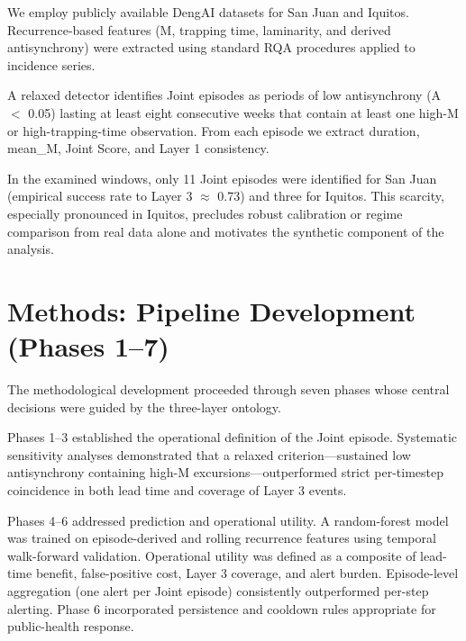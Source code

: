 \documentclass[11pt,a4paper]{article}
\begin{document}
We employ publicly available DengAI datasets for San Juan and Iquitos. Recurrence-based features (M, trapping time, laminarity, and derived antisynchrony) were extracted using standard RQA procedures applied to incidence series.

A relaxed detector identifies Joint episodes as periods of low antisynchrony (A $<$ 0.05) lasting at least eight consecutive weeks that contain at least one high-M or high-trapping-time observation. From each episode we extract duration, mean\_M, Joint Score, and Layer 1 consistency.

In the examined windows, only 11 Joint episodes were identified for San Juan (empirical success rate to Layer 3 $\approx$ 0.73) and three for Iquitos. This scarcity, especially pronounced in Iquitos, precludes robust calibration or regime comparison from real data alone and motivates the synthetic component of the analysis.

\section{Methods: Pipeline Development (Phases 1--7)}

The methodological development proceeded through seven phases whose central decisions were guided by the three-layer ontology.

Phases 1--3 established the operational definition of the Joint episode. Systematic sensitivity analyses demonstrated that a relaxed criterion—sustained low antisynchrony containing high-M excursions—outperformed strict per-timestep coincidence in both lead time and coverage of Layer 3 events.

Phases 4--6 addressed prediction and operational utility. A random-forest model was trained on episode-derived and rolling recurrence features using temporal walk-forward validation. Operational utility was defined as a composite of lead-time benefit, false-positive cost, Layer 3 coverage, and alert burden. Episode-level aggregation (one alert per Joint episode) consistently outperformed per-step alerting. Phase 6 incorporated persistence and cooldown rules appropriate for public-health response.
\end{document}

